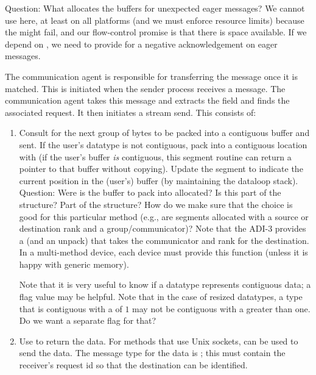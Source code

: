 \begin{mmadi}
\begin{tcp}
Question: What allocates the buffers for unexpected eager messages?  We cannot
use  here, at least on all platforms (and we must enforce
resource limits) because the  might fail, and our flow-control
promise is that there is space available.  If we depend on , we
need to provide for a negative acknowledgement on eager messages.


The communication agent is responsible for transferring the message once it is
matched.  This is initiated when the sender process receives a
 message.
The communication agent takes this message and extracts the
 field and finds the associated
request.  It then initiates a stream send.  This consists of:
\begin{enumerate}
\item Consult  for the next group of bytes
  to be packed into a contiguous buffer and sent.  If the user's datatype is
  not contiguous, pack into a contiguous 
  location with  (if the user's buffer \emph{is}
  contiguous, this segment routine can return a pointer to that buffer without
  copying).  Update the segment to indicate the
  current position in the (user's) buffer (by maintaining the dataloop
  stack). 
  Question: Were is the buffer to pack into allocated?  Is this part of the 
   structure?  Part of the 
  structure? How do we make sure that the choice is
  good for this particular method (e.g., are segments allocated with a source
  or destination rank and a group/communicator)?  Note that the ADI-3 provides
  a  (and an unpack) that takes the
  communicator and rank for the destination.  In a multi-method device, each
  device must provide this function (unless it is happy with generic memory).

  Note that it is very useful to know if a datatype represents contiguous
  data; a  flag value may be helpful.  Note
  that in the case of resized datatypes, a type that is contiguous with a
   of $1$ may not be contiguous with a  greater than
  one.  Do we want a separate flag for that?  

\item Use  to return the data.  For methods that use Unix
  sockets,  can be used to send the data.  The
  message type for the data is ; this must contain
  the receiver's request id so that the destination can be identified.


\end{enumerate}
\end{tcp}
\end{mmadi}
